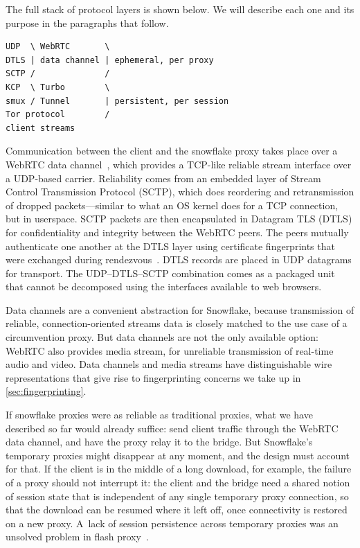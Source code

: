 \documentclass[letterpaper,twocolumn]{article}
\begin{document}
The full stack of protocol layers is shown below.
We will describe each one and its purpose
in the paragraphs that follow.

\begin{verbatim}
UDP  \ WebRTC       \
DTLS | data channel | ephemeral, per proxy
SCTP /              /
KCP  \ Turbo        \
smux / Tunnel       | persistent, per session
Tor protocol        /
client streams
\end{verbatim}

Communication between the client and the snowflake proxy
takes place over
a WebRTC data channel~\cite{rfc8831}, which
provides a TCP-like
reliable stream interface over a UDP-based carrier.
Reliability comes from an embedded layer of
Stream Control Transmission Protocol (SCTP), which
does reordering and retransmission of dropped packets---similar
to what an OS kernel does for a TCP connection,
but in userspace.
SCTP packets are then encapsulated in Datagram TLS (DTLS)
for confidentiality and integrity between the WebRTC peers.
The peers mutually authenticate one another
at the DTLS layer using certificate fingerprints
that were exchanged during rendezvous~\cite[\S 5.1]{rfc8842}.
DTLS records are placed in UDP datagrams for transport.
The UDP--DTLS--SCTP combination comes as a packaged unit
that cannot be decomposed using the interfaces available to web browsers.

Data channels are a convenient abstraction for Snowflake,
because transmission of reliable,
connection-oriented streams data is closely matched
to the use case of a circumvention proxy.
But data channels are not the only available option:
WebRTC also provides media stream,
for unreliable transmission of real-time audio and video.
Data channels and media streams have distinguishable wire representations
that give rise to fingerprinting concerns we take up in \autoref{sec:fingerprinting}.

If snowflake proxies were as reliable as traditional proxies,
what we have described so far would already suffice:
send client traffic through the WebRTC data channel,
and have the proxy relay it to the bridge.
But Snowflake's temporary proxies might
disappear at any moment,
and the design must account for that.
If the client is in the middle of a long download,
for example, the failure of a proxy should not interrupt it:
the client and the bridge need a shared notion of session state
that is independent of any single temporary proxy connection,
so that the download can be resumed where it left off,
once connectivity is restored on a new proxy.
A~lack of session persistence across temporary proxies
was an unsolved problem in flash proxy~\cite[\S 5.2]{Fifield2012a}.
\end{document}
